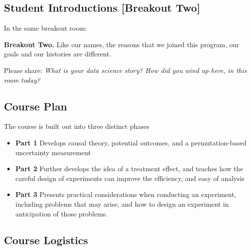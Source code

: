 \documentclass[
]{article}
\providecommand{\tightlist}{%
  \setlength{\itemsep}{0pt}\setlength{\parskip}{0pt}}
\theoremstyle{definition}
\theoremstyle{definition}
\theoremstyle{definition}
\theoremstyle{definition}
\theoremstyle{remark}
\begin{document}
\subsection{Student Introductions {[}Breakout Two{]}}\label{student-introductions-breakout-two}

In the same breakout room:

\begin{breakout}
\textbf{Breakout Two.}
Like our names, the reasons that we joined this program, our goals and our histories are different.

Please share: \emph{What is your data science story? How did you wind up here, in this room today?}

\end{breakout}

\subsection{Course Plan}\label{course-plan}

The course is built out into three distinct phases

\begin{itemize}
\tightlist
\item
  \textbf{Part 1} Develops causal theory, potential outcomes, and a permutation-based uncertainty measurement
\item
  \textbf{Part 2} Further develops the idea of a treatment effect, and teaches how the careful design of experiments can improve the efficiency, and easy of analysis
\item
  \textbf{Part 3} Presents practical considerations when conducting an experiment, including problems that may arise, and how to design an experiment in anticipation of those problems.
\end{itemize}

\subsection{Course Logistics}\label{course-logistics}
\end{document}
